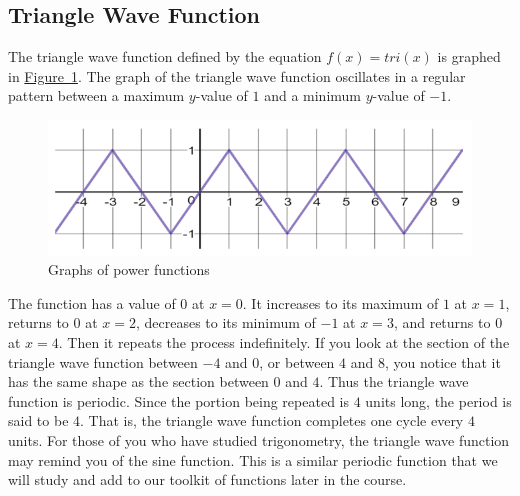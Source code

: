 \documentclass[10pt,]{book}
\theoremstyle{ptxdefinitionnotitle}
\theoremstyle{ptxdefinitiontitle}
\numberwithin{equation}{section}
\begin{document}
\subsection[{Triangle Wave Function}]{Triangle Wave Function}\label{subsection-12}
\hypertarget{p-58}{}%
The triangle wave function defined by the equation \(f(x) = tri(x)\) is graphed in \hyperref[chapter02-section02-twave]{Figure~\ref{chapter02-section02-twave}}. The graph of the triangle wave function oscillates in a regular pattern between a maximum  \(y\)-value of \(1\) and a minimum \(y\)-value of \(-1\).%
\begin{figure}
\centering
\includegraphics[width=1\linewidth]{./src/images/chapter02/chapter02section02-twave.png}
\caption{Graphs of power functions\label{chapter02-section02-twave}}
\end{figure}
\hypertarget{p-59}{}%
The function has a value of \(0\) at \(x = 0\).  It increases to its maximum of \(1\) at \(x = 1\), returns to \(0\) at \(x = 2\), decreases to its minimum of \(-1\) at \(x = 3\), and returns to \(0\) at \(x = 4\).  Then it repeats the process indefinitely.  If you look at the section of the triangle wave function between \(-4\) and \(0\), or between \(4\) and \(8\), you notice that it has the same shape as the section between \(0\) and \(4\).  Thus the triangle wave function is periodic.  Since the portion being repeated is \(4\) units long, the period is said to be \(4\).  That is, the triangle wave function completes one cycle every \(4\) units.  For those of you who have studied trigonometry, the triangle wave function may remind you of the sine function.  This is a similar periodic function that we will study and add to our toolkit of functions later in the course.%
\typeout{************************************************}
\typeout{************************************************}
\end{document}
